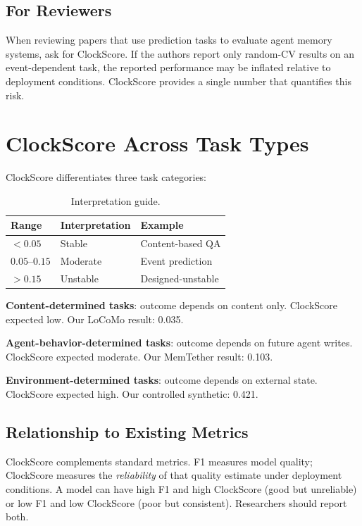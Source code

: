 \documentclass[sigconf,nonacm]{acmart}
\begin{document}
\subsection{For Reviewers}
When reviewing papers that use prediction tasks to evaluate agent memory systems, ask for ClockScore. If the authors report only random-CV results on an event-dependent task, the reported performance may be inflated relative to deployment conditions. ClockScore provides a single number that quantifies this risk.

\section{ClockScore Across Task Types}

ClockScore differentiates three task categories:

\begin{table}[h]
\centering
\caption{Interpretation guide.}
\begin{tabular}{lll}
\toprule
Range & Interpretation & Example \\
\midrule
$< 0.05$ & Stable & Content-based QA \\
$0.05$--$0.15$ & Moderate & Event prediction \\
$> 0.15$ & Unstable & Designed-unstable \\
\bottomrule
\end{tabular}
\end{table}

\textbf{Content-determined tasks}: outcome depends on content only. ClockScore expected low. Our LoCoMo result: 0.035.

\textbf{Agent-behavior-determined tasks}: outcome depends on future agent writes. ClockScore expected moderate. Our MemTether result: 0.103.

\textbf{Environment-determined tasks}: outcome depends on external state. ClockScore expected high. Our controlled synthetic: 0.421.

\subsection{Relationship to Existing Metrics}

ClockScore complements standard metrics. F1 measures model quality; ClockScore measures the \emph{reliability} of that quality estimate under deployment conditions. A model can have high F1 and high ClockScore (good but unreliable) or low F1 and low ClockScore (poor but consistent). Researchers should report both.
\end{document}
